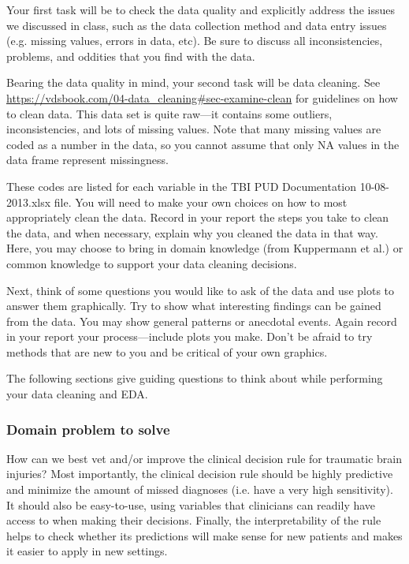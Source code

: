 \documentclass[10pt,letterpaper]{article}
\begin{document}
Your first task will be to check the data quality and explicitly address the issues we discussed in class, such as the data collection method and data entry issues (e.g. missing values, errors in data, etc). Be sure to discuss all inconsistencies, problems, and oddities that you find with the data.

Bearing the data quality in mind, your second task will be data cleaning. See \url{https://vdsbook.com/04-data_cleaning#sec-examine-clean} for guidelines on how to clean data. This data set is quite raw---it contains some outliers, inconsistencies, and lots of missing values. Note that many missing values are coded as a number in the data, so you cannot assume that only NA values in the data frame represent missingness.

These codes are listed for each variable in the TBI PUD Documentation 10-08-2013.xlsx file. You will need to make your own choices on how to most appropriately clean the data. Record in your report the steps you take to clean the data, and when necessary, explain why you cleaned the data in that way. Here, you may choose to bring in domain knowledge (from Kuppermann et al.) or common knowledge to support your data cleaning decisions.

Next, think of some questions you would like to ask of the data and use plots to answer them graphically. Try to show what interesting findings can be gained from the data. You may show general patterns or anecdotal events. Again record in your report your process---include plots you make. Don’t be afraid to try methods that are new to you and be critical of your own graphics.

The following sections give guiding questions to think about while performing your data cleaning and EDA.

\subsubsection*{Domain problem to solve}

How can we best vet and/or improve the clinical decision rule for traumatic brain injuries? Most importantly, the clinical decision rule should be highly predictive and minimize the amount of missed diagnoses (i.e. have a very high sensitivity). It should also be easy-to-use, using variables that clinicians can readily have access to when making their decisions. Finally, the interpretability of the rule helps to check whether its predictions will make sense for new patients and makes it easier to apply in new settings.
\end{document}
